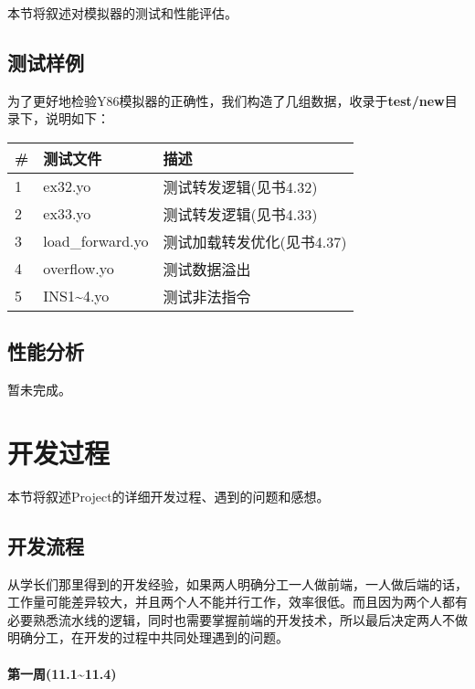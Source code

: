 \documentclass[12pt]{article} %
\begin{document}
\begin{sloppypar}
本节将叙述对模拟器的测试和性能评估。

\subsection{测试样例}

为了更好地检验Y86模拟器的正确性，我们构造了几组数据，收录于{\bf test/new}目录下，说明如下：

\begin{table}[h]
\begin{tabular}{|l|l|l|}
\hline
{\bf \#} & {\bf 测试文件}                          & {\bf 描述}                   \\ 
\hline
1        & ex32.yo	                   & 测试转发逻辑(见书4.32)        \\ 
\hline
2        & ex33.yo                       & 测试转发逻辑(见书4.33)           \\ 
\hline
3        & load\_forward.yo	        & 测试加载转发优化(见书4.37)            \\ 
\hline
4        & overflow.yo          & 测试数据溢出               \\ 
\hline
5        & INS1\~{}4.yo             & 测试非法指令                   \\ 
\hline
\end{tabular}
\end{table}

\subsection{性能分析}

暂未完成。

\clearpage
\section{开发过程}

本节将叙述Project的详细开发过程、遇到的问题和感想。

\subsection{开发流程}

从学长们那里得到的开发经验，如果两人明确分工一人做前端，一人做后端的话，工作量可能差异较大，并且两个人不能并行工作，效率很低。而且因为两个人都有必要熟悉流水线的逻辑，同时也需要掌握前端的开发技术，所以最后决定两人不做明确分工，在开发的过程中共同处理遇到的问题。

\paragraph{第一周(11.1\~{}11.4)}


\end{sloppypar}
\end{document}
